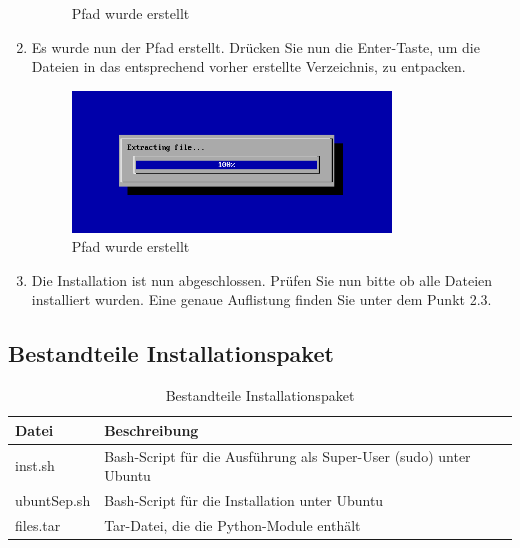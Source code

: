 \documentclass[12pt]{scrartcl}
\begin{document}
\begin{enumerate}
\begin{figure}[htbp]
\caption{Pfad wurde erstellt}
\label{fig:script5}
\end{figure}
\newpage
\item Es wurde nun der Pfad erstellt. Drücken Sie nun die Enter-Taste, um die Dateien
in das entsprechend vorher erstellte Verzeichnis, zu entpacken.
\begin{figure}[htbp]
\centering
\includegraphics[width=0.8\textwidth]{schritt6}\par\vspace{0.5cm}
\caption{Pfad wurde erstellt}
\label{fig:script6}
\end{figure}
\item Die Installation ist nun abgeschlossen. Prüfen Sie nun 
bitte ob alle Dateien installiert wurden. Eine genaue Auflistung finden
Sie unter dem Punkt 2.3.
\end{enumerate} 
\subsection{Bestandteile Installationspaket}
\label{sec:installationsbestandteile}
\begin{table}[H]
\centering
\label{installationsbestandteile}
\begin{tabular}{|l|l|}
\hline
\rowcolor[HTML]{9B9B9B} 
Datei        & Beschreibung                                                      \\ \hline
inst.sh      & Bash-Script für die Ausführung als Super-User (sudo) unter Ubuntu \\ \hline
ubuntSep.sh  & Bash-Script für die Installation unter Ubuntu                     \\ \hline
files.tar    & Tar-Datei, die die Python-Module enthält                          \\ \hline
\end{tabular}
\caption{Bestandteile Installationspaket}
\end{table}
\end{document}
